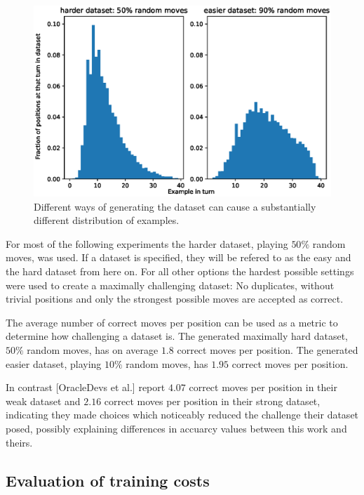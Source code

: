 \documentclass[12pt,onecolumn,oneside,titlepage]{article}
\begin{document}
\begin{figure}[H]
\centering
\includegraphics[clip,width=\columnwidth]{dataset_hist}
\caption{Different ways of generating the dataset can cause a substantially different distribution of examples.}
\label{fig:dataset_hist}
\end{figure}



For most of the following experiments the harder dataset, playing $50\%$ random moves, was used. If a dataset is specified, they will be refered to as the easy and the hard dataset from here on.
For all other options the hardest possible settings were used to create a maximally challenging dataset:
No duplicates, without trivial positions and only the strongest possible moves are accepted as correct.

The average number of correct moves per position can be used as a metric to determine how challenging a dataset is. The generated maximally hard dataset, $50\%$ random moves, has on average $1.8$ correct moves per position. The generated easier dataset, playing $10\%$ random moves, has $1.95$ correct moves
per position.

In contrast \cite{oracledevs}[OracleDevs et al.] report $4.07$ correct moves per position in their weak dataset and $2.16$ correct moves per position in their strong dataset, indicating they made choices which noticeably reduced the challenge their dataset posed, 
possibly explaining differences in accuarcy values between this work and theirs.

\subsection{Evaluation of training costs}
\end{document}
